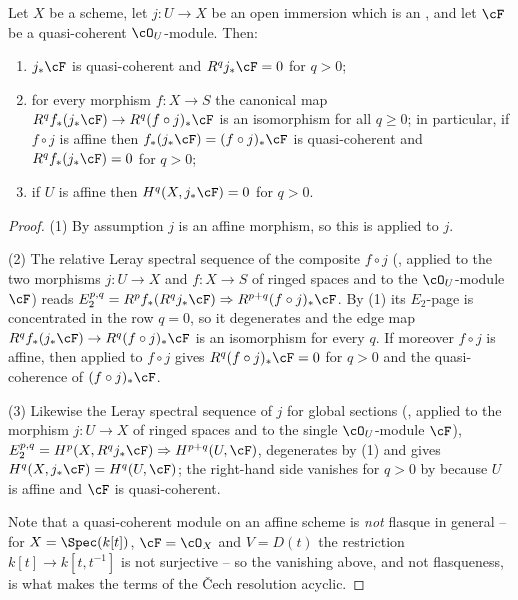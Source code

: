 \begin{lemma}
\label{lem:pc-affine-immersion-acyclic}
Let $X$ be a scheme, let $j:U\to X$ be an open immersion which is an
, and let $\cF$
be a quasi-coherent $\cO_U$-module.  Then:
\begin{enumerate}
\item $j_*\cF$ is quasi-coherent and $R^qj_*\cF=0$ for $q>0$;
\item for every morphism $f:X\to S$ the canonical map
$R^qf_*(j_*\cF)\to R^q(f\circ j)_*\cF$ is an isomorphism for all
$q\ge0$; in particular, if $f\circ j$ is affine then
$f_*(j_*\cF)=(f\circ j)_*\cF$ is quasi-coherent and
$R^qf_*(j_*\cF)=0$ for $q>0$;
\item if $U$ is affine then $H^q(X,j_*\cF)=0$ for $q>0$.
\end{enumerate}
\end{lemma}
\begin{proof}
(1) By assumption $j$ is an affine morphism, so this is
 applied to $j$.

(2) The relative Leray spectral sequence of the composite $f\circ j$
(, applied to the two
morphisms $j:U\to X$ and $f:X\to S$ of ringed spaces and to the
$\cO_U$-module $\cF$) reads
$E_2^{p,q}=R^pf_*(R^qj_*\cF)\Rightarrow R^{p+q}(f\circ j)_*\cF$.  By
(1) its $E_2$-page is concentrated in the row $q=0$, so it degenerates
and the edge map $R^qf_*(j_*\cF)\to R^q(f\circ j)_*\cF$ is an
isomorphism for every $q$.  If moreover $f\circ j$ is affine, then
 applied to $f\circ j$ gives
$R^q(f\circ j)_*\cF=0$ for $q>0$ and the quasi-coherence of
$(f\circ j)_*\cF$.

(3) Likewise the Leray spectral sequence of $j$ for global sections
(, applied to the morphism
$j:U\to X$ of ringed spaces and to the single $\cO_U$-module $\cF$),
$E_2^{p,q}=H^p(X,R^qj_*\cF)\Rightarrow H^{p+q}(U,\cF)$, degenerates by
(1) and gives $H^q(X,j_*\cF)=H^q(U,\cF)$; the right-hand side vanishes
for $q>0$ by  because $U$ is affine and
$\cF$ is quasi-coherent.

Note that a quasi-coherent module on an affine scheme is \emph{not}
flasque in general -- for $X=\Spec(k[t])$, $\cF=\cO_X$ and $V=D(t)$
the restriction $k[t]\to k[t,t^{-1}]$ is not surjective -- so the
vanishing above, and not flasqueness, is what makes the terms of the
Čech resolution acyclic.
\end{proof}

